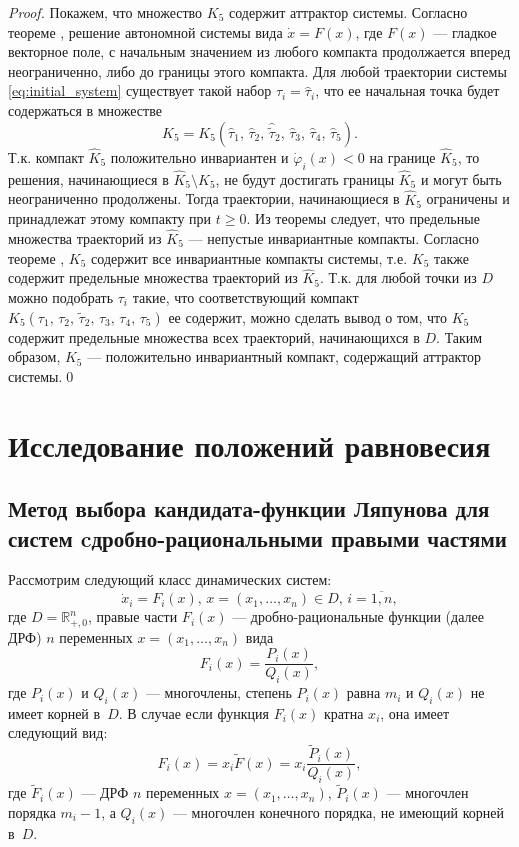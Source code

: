 \documentclass[14pt,a4paper]{extarticle}
\begin{document}
\begin{proof}
		Покажем, что множество $K_5$ содержит аттрактор системы. Согласно теореме , решение автономной системы вида $\dot{x}=F(x)$, где $F(x)$ --- гладкое векторное поле, с начальным значением из любого компакта продолжается вперед неограниченно, либо до границы этого компакта. Для любой траектории системы \ref{eq:initial_system} существует такой набор $\tau_i = \hat{\tau}_i$, что ее начальная точка будет содержаться в множестве 
		\[\hat{K}_5 = K_5(\hat\tau_1,\,\hat\tau_2,\,\hat{\tilde{\tau}}_2,\,\hat\tau_3,\,\hat\tau_4,\,\hat\tau_5).\]
		Т.к. компакт $\hat{K}_5$ положительно инвариантен и $\dot{\varphi}_i(x)<0$ на границе $\hat{K}_5$, то решения, начинающиеся в $\hat{K}_5\setminus K_5$, не будут достигать границы $\hat{K}_5$ и могут быть неограниченно продолжены. Тогда траектории, начинающиеся в $\hat{K}_5$ ограничены и принадлежат этому компакту при $t\ge0$. Из теоремы  следует, что предельные множества траекторий из $\hat{K}_5$ --- непустые инвариантные компакты. Согласно теореме , $K_5$ содержит все инвариантные компакты системы, т.е. $K_5$ также содержит предельные множества траекторий из $\hat{K}_5$. Т.к. для любой точки из $D$ можно подобрать $\tau_i$ такие, что соответствующий компакт $K_5(\tau_1,\,\tau_2,\,\tilde{\tau}_2,\,\tau_3,\,\tau_4,\,\tau_5)$ ее содержит, можно сделать вывод о том, что $K_5$ содержит предельные множества всех траекторий, начинающихся в $D$. Таким образом, $K_5$ --- положительно инвариантный компакт, содержащий аттрактор системы.\qed
		
	\end{proof}	
	
	\section{Исследование положений равновесия}
	\subsection{Метод выбора кандидата-функции Ляпунова для систем c\linebreak дробно-рациональными правыми частями}
	
	Рассмотрим следующий класс динамических систем:
	\[\dot{x}_i=F_i(x),\, x=(x_1,\ldots,x_n)\in D,\, i=\overline{1,n},\]
	где $D = \mathbb{R}^{n}_{+,0}$, правые части $F_i(x)$ --- дробно-рациональные функции (далее ДРФ) $n$ переменных $x=(x_1,\ldots,x_n)$ вида 
	\[F_i(x)=\dfrac{P_i(x)}{Q_i(x)},\]
	где $P_i(x)$ и $Q_i(x)$ --- многочлены, степень $P_i(x)$ равна $m_i$ и $Q_i(x)$ не имеет корней в~$D$. В случае если функция $F_i(x)$ кратна $x_i$, она имеет следующий вид:
	\[F_i(x)=x_i\tilde{F}(x) = x_i\dfrac{\tilde{P}_i(x)}{Q_i(x)},\]
	где $\tilde{F}_i(x)$ --- ДРФ $n$ переменных $x=(x_1,\ldots,x_n)$, $\tilde{P}_i(x)$ --- многочлен порядка $m_i-1$, а $Q_i(x)$ --- многочлен конечного порядка, не имеющий корней в~$D$.
	
\end{document}
